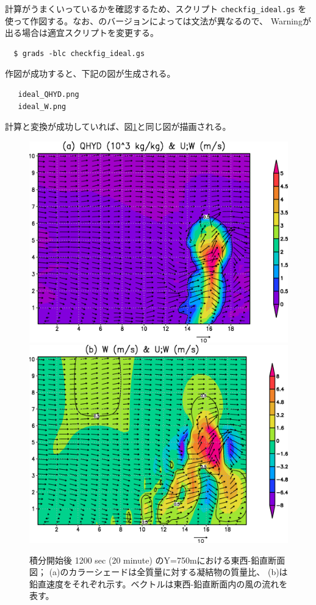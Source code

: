 計算がうまくいっているかを確認するため、\grads スクリプト \verb|checkfig_ideal.gs|
を使って作図する。なお、\grads のバージョンによっては文法が異なるので、
Warningが出る場合は適宜\grads スクリプトを変更する。
\begin{verbatim}
  $ grads -blc checkfig_ideal.gs
\end{verbatim}
作図が成功すると、下記の図が生成される。
\begin{verbatim}
   ideal_QHYD.png
   ideal_W.png
\end{verbatim}
計算と変換が成功していれば、図\ref{fig_ideal}と同じ図が描画される。

\begin{figure}[t]
\begin{center}
  \includegraphics[width=0.7\hsize]{./figure/ideal_qhyd.eps}\\
  \includegraphics[width=0.7\hsize]{./figure/ideal_W.eps}\\
  \caption{積分開始後 1200 sec (20 minute) のY=750mにおける東西-鉛直断面図；
           (a)のカラーシェードは全質量に対する凝結物の質量比、
           (b)は鉛直速度をそれぞれ示す。ベクトルは東西-鉛直断面内の風の流れを表す。}
  \label{fig_ideal}
\end{center}
\end{figure}



